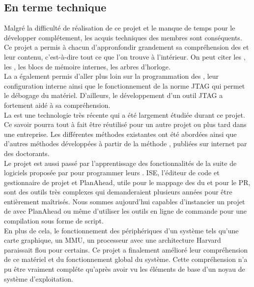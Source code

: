 \subsection{En terme technique}

Malgré la difficulté de réalisation de ce projet et le manque de temps pour le développer complétement, les acquis techniques des membres sont conséquents.\\
Ce projet a permis à chacun d'appronfondir grandement sa compréhension des \fpgas{} et leur contenu, c'est-à-dire tout ce que l'on trouve à l'intérieur. On peut citer les , les , les blocs de mémoire internes, les arbres d'horloge.\\
La  a également permis d'aller plus loin sur la programmation des \fpgas{}, leur configuration interne ainsi que le fonctionnement de la norme JTAG qui permet le débogage du matériel. D'ailleurs, le développement d'un outil JTAG a fortement aidé à sa compréhension.\\

La  est une technologie très récente qui a été largement étudiée durant ce projet. Ce savoir pourra tout à fait être réutilisé pour un autre projet ou plus tard dans une entreprise. Les différentes méthodes existantes ont été abordées ainsi que d'autres méthodes développées à partir de la méthode , publiées sur internet par des doctorants.\\

Le projet est aussi passé par l'apprentissage des fonctionnalités de la suite de logiciels proposée par  pour programmer leurs \fpgas{}.
ISE, l'éditeur de code et gestionnaire de projet et PlanAhead, utile pour le mappage des  du \fpga{} et pour le PR, sont des outils très complexes qui demanderaient plusieurs années pour être entièrement maîtrisés. Nous sommes aujourd'hui capables d'instancier un projet de  avec PlanAhead ou même d'utiliser les outils  en ligne de commande pour une compilation sous forme de script.\\
En plus de cela, le fonctionnement des périphériques d'un système tels qu'une carte graphique, un MMU, un processeur avec une architecture Harvard paraissait flou pour certains. Ce projet a finalement amélioré leur compréhension de ce matériel et du fonctionnement global du système. Cette compréhension n'a pu être vraiment compléte qu'après avoir vu les éléments de base d'un noyau de système d'exploitation.\\

